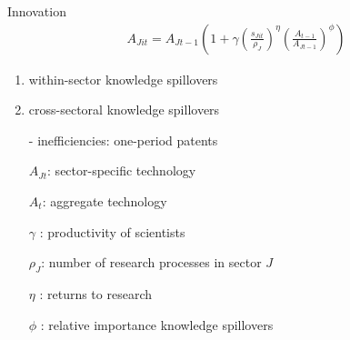\documentclass[11pt,aspectratio=169]{beamer}
\begin{document}
\addtocounter{framenumber}{-1}
\begin{frame}{Innovation}
	\vspace{-5mm}
	\large
	\begin{align*}
		A_{Jit}={A_{Jt-1}}\left(1+\gamma\left(\frac{s_{Jit}}{\rho_J}\right)^\eta{\left(\frac{A_{t-1}}{A_{Jt-1}}\right)^\phi}\right)
	\end{align*}
	\normalsize
	\begin{enumerate}
		\item within-sector knowledge spillovers %

		\item {cross-sectoral knowledge spillovers} 
				\item[-] \alert{inefficiencies: one-period patents}%
	\end{enumerate}
	\small
	\vspace{4mm}
	\hspace{-2mm}
	\begin{minipage}[t!]{0.43\textwidth}
		\vspace{0mm}
		\begin{itemize}
			\item[] $A_{Jt}$: sector-specific technology
			\vspace{-2mm}		
			\item[] $A_t$: aggregate technology 
			\vspace{-2mm}
			\item[] $\gamma$ : productivity of scientists
		\end{itemize}
	\end{minipage}
	\vspace{-5mm}
	\begin{minipage}[t!]{0.55\textwidth}
		\vspace{0mm}
		\begin{itemize}	
			\item[] $\rho_J$: number of research processes in sector $J$
			\vspace{-2mm}			
			\item[] $\eta$ : returns to research
			\vspace{-2mm}			
			\item[] $\phi$ : relative importance knowledge spillovers
		\end{itemize}
	\end{minipage}
\end{frame}
\end{document}
